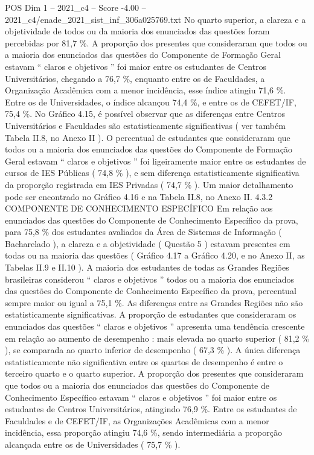 \begin{textsample}{POS Dim 1 – 2021\_c4 – Score -4.00 – 2021\_c4/enade\_2021\_sist\_inf\_306a025769.txt}
No quarto superior, a clareza e a objetividade de todos ou da maioria dos enunciados das questões foram percebidas por 81,7 \%.
A proporção dos presentes que consideraram que todos ou a maioria dos enunciados das questões do Componente de Formação Geral estavam “ claros e objetivos ” foi maior entre os estudantes de Centros Universitários, chegando a 76,7 \%, enquanto entre os de Faculdades, a Organização Acadêmica com a menor incidência, esse índice atingiu 71,6 \%.
Entre os de Universidades, o índice alcançou 74,4 \%, e entre os de CEFET/IF, 75,4 \%.
No Gráfico 4.15, é possível observar que as diferenças entre Centros Universitários e Faculdades são estatisticamente significativas ( ver também Tabela II.8, no Anexo II ).
O percentual de estudantes que consideraram que todos ou a maioria dos enunciados das questões do Componente de Formação Geral estavam “ claros e objetivos ” foi ligeiramente maior entre os estudantes de cursos de IES Públicas ( 74,8 \% ), e sem diferença estatisticamente significativa da proporção registrada em IES Privadas ( 74,7 \% ).
Um maior detalhamento pode ser encontrado no Gráfico 4.16 e na Tabela II.8, no Anexo II. 4.3.2 COMPONENTE DE CONHECIMENTO ESPECÍFICO Em relação aos enunciados das questões do Componente de Conhecimento Específico da prova, para 75,8 \% dos estudantes avaliados da Área de Sistemas de Informação ( Bacharelado ), a clareza e a objetividade ( Questão 5 ) estavam presentes em todas ou na maioria das questões ( Gráfico 4.17 a Gráfico 4.20, e no Anexo II, as Tabelas II.9 e II.10 ).
A maioria dos estudantes de todas as Grandes Regiões brasileiras considerou “ claros e objetivos ” todos ou a maioria dos enunciados das questões do Componente de Conhecimento Específico da prova, percentual sempre maior ou igual a 75,1 \%.
As diferenças entre as Grandes Regiões não são estatisticamente significativas.
A proporção de estudantes que consideraram os enunciados das questões “ claros e objetivos ” apresenta uma tendência crescente em relação ao aumento de desempenho : mais elevada no quarto superior ( 81,2 \% ), se comparada ao quarto inferior de desempenho ( 67,3 \% ).
A única diferença estatisticamente não significativa entre os quartos de desempenho é entre o terceiro quarto e o quarto superior.
A proporção dos presentes que consideraram que todos ou a maioria dos enunciados das questões do Componente de Conhecimento Específico estavam “ claros e objetivos ” foi maior entre os estudantes de Centros Universitários, atingindo 76,9 \%.
Entre os estudantes de Faculdades e de CEFET/IF, as Organizações Acadêmicas com a menor incidência, essa proporção atingiu 74,6 \%, sendo intermediária a proporção alcançada entre os de Universidades ( 75,7 \% ).

\end{textsample}
